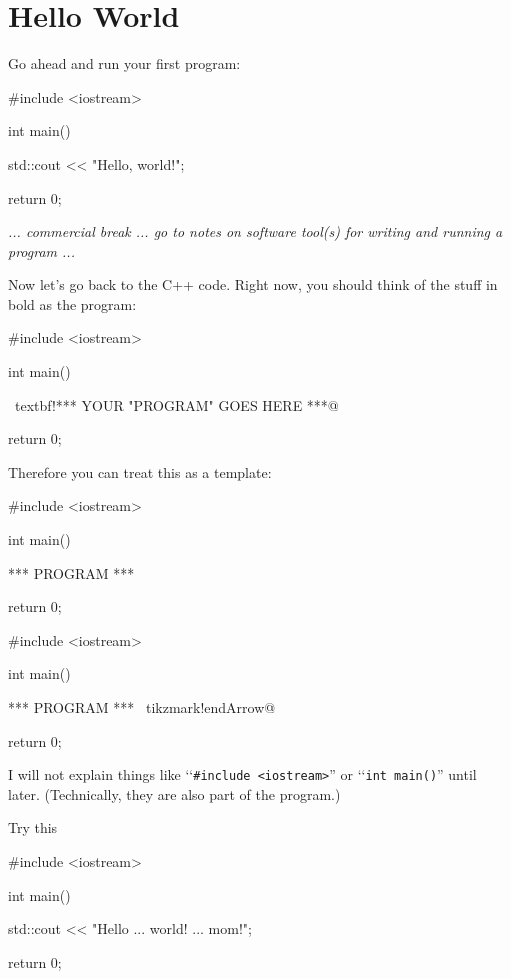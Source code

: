 \newpage\section{Hello World}

Go ahead and run your first program:
\begin{console}
#include <iostream>

int main()
{
    std::cout << "Hello, world!\n";

    return 0;
}
\end{console}

{\it ... commercial break ... go to notes on software tool(s) for writing and 
running a program ...}

Now let's go back to the C++ code. Right now, you should think of the stuff in bold as the program:
\begin{console}[commandchars=\~\!\@]
#include <iostream>

int main()
{
    ~textbf!*** YOUR "PROGRAM" GOES HERE ***@

    return 0;
}
\end{console}


Therefore you can treat this as a template:


\begin{console}[commandchars=\~\!\@]
#include <iostream>

int main()
{

    *** PROGRAM ***

    return 0;
}
\end{console}

\begin{console}[commandchars=\~\!\@]
#include <iostream>

int main()
{

    *** PROGRAM *** ~tikzmark!endArrow@
    
    return 0;
}
\end{console}

I will not explain things like 
\lq\lq \verb!#include <iostream>!'' or 
\lq\lq\verb!int main()!'' until later. 
(Technically, they are also part of  the program.)



Try this
\begin{console}
#include <iostream>

int main()
{
    std::cout << "Hello ... world! ... mom!\n";

    return 0;
}
\end{console}


